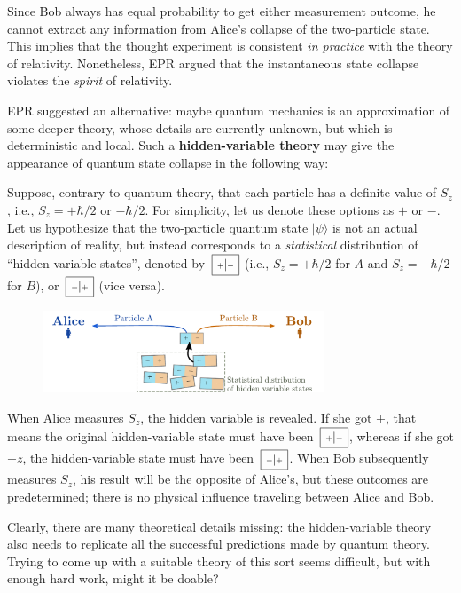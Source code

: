 \documentclass[pra,12pt]{revtex4-2}
\def\hvbox[#1]#2{\,\boxed{\scalebox{0.7}{$\,#1$}|\scalebox{0.7}{$#2\,$}}}
\begin{document}
Since Bob always has equal probability to get either measurement
outcome, he cannot extract any information from Alice's collapse of
the two-particle state.  This implies that the thought experiment is
consistent \textit{in practice} with the theory of relativity.
Nonetheless, EPR argued that the instantaneous state collapse violates
the \textit{spirit} of relativity.

EPR suggested an alternative: maybe quantum mechanics is an
approximation of some deeper theory, whose details are currently
unknown, but which is deterministic and local.  Such a
\textbf{hidden-variable theory} may give the appearance of quantum
state collapse in the following way:

Suppose, contrary to quantum theory, that each particle has a definite
value of $S_z$, i.e., $S_z = +\hbar/2$ or $-\hbar/2$.  For simplicity,
let us denote these options as $+$ or $-$.  Let us hypothesize that
the two-particle quantum state $|\psi\rangle$ is not an actual
description of reality, but instead corresponds to a
\textit{statistical} distribution of ``hidden-variable states'',
denoted by $\hvbox[+]{-}$ (i.e., $S_z = +\hbar/2$ for $A$ and $S_z =
-\hbar/2$ for $B$), or $\hvbox[-]{+}$ (vice versa).

\begin{figure}[h]
  \centering\includegraphics[width=0.75\textwidth]{hiddenvariables}
\end{figure}

When Alice measures $S_z$, the hidden variable is revealed.  If she
got $+$, that means the original hidden-variable state must have been
$\hvbox[+]{-}$, whereas if she got $-z$, the hidden-variable state
must have been $\hvbox[-]{+}$.  When Bob subsequently measures $S_z$,
his result will be the opposite of Alice's, but these outcomes are
predetermined; there is no physical influence traveling between Alice
and Bob.

Clearly, there are many theoretical details missing: the
hidden-variable theory also needs to replicate all the successful
predictions made by quantum theory.  Trying to come up with a suitable
theory of this sort seems difficult, but with enough hard work, might
it be doable?
\end{document}
